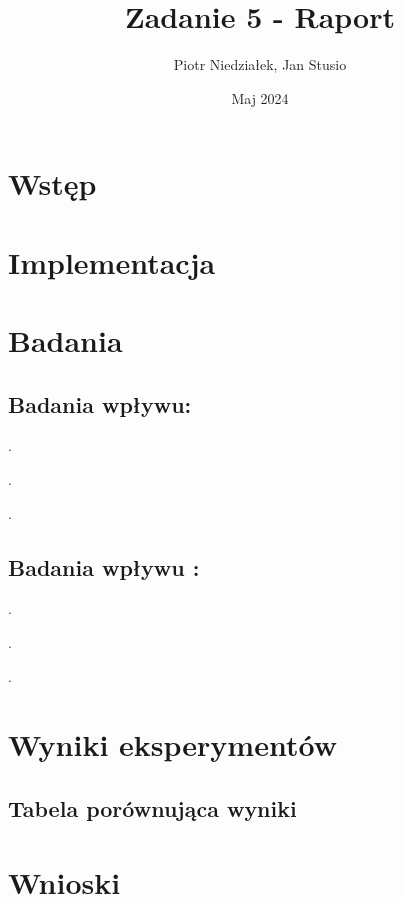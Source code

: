 \documentclass{article}
\title{Zadanie 5 - Raport}
\author{Piotr Niedziałek, Jan Stusio}
\date{Maj 2024}
\begin{document}
\maketitle

\section{Wstęp}



\section{Implementacja}



\section{Badania}

\subsection{Badania wpływu\@:}

. 

. 

.

\subsection{Badania wpływu \@:}

.

. 

. 

\pagebreak

\section{Wyniki eksperymentów}

\subsection{Tabela porównująca wyniki}


\section{Wnioski}
\end{document}
